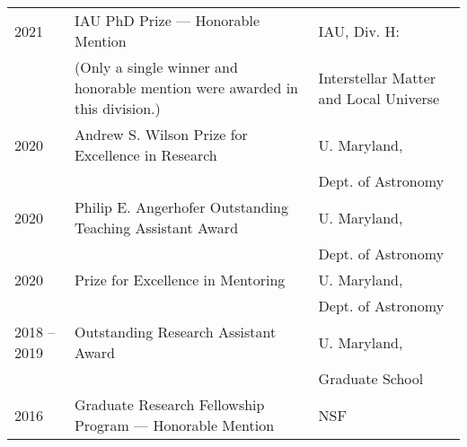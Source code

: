\documentclass[11pt]{article}
\begin{document}
\begin{longtable}{p{}p{}p{}}

2021 & {IAU PhD Prize --- Honorable Mention} & {\small IAU, Div. H:}\\
 & {\footnotesize (Only a single winner and honorable mention were awarded in this division.)} & {\small Interstellar Matter and Local Universe} \smallskip\\

2020 & Andrew S. Wilson Prize for Excellence in Research & {\small U. Maryland,}\\
&& {\small Dept. of Astronomy}\smallskip\\

2020 & Philip E. Angerhofer Outstanding Teaching Assistant Award & {\small U. Maryland,}\\
&& {\small Dept. of Astronomy}\smallskip\\

2020 & Prize for Excellence in Mentoring & {\small U. Maryland,}\\
&  & {\small Dept. of Astronomy}\smallskip\\

2018 -- 2019 & Outstanding Research Assistant Award & {\small U. Maryland,} \\
&& {\small Graduate School}\smallskip\\

2016 & {Graduate Research Fellowship Program --- Honorable Mention} & {\small NSF}\\

\end{longtable}
\end{document}

